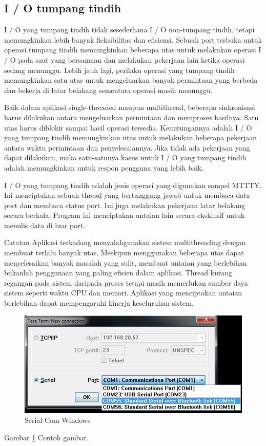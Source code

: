 		\subsection{I / O tumpang tindih}
		\begin{enumerate}
		
				I / O yang tumpang tindih tidak sesederhana I / O non-tumpang tindih, tetapi memungkinkan lebih banyak fleksibilitas dan efisiensi. Sebuah port terbuka untuk operasi tumpang tindih memungkinkan beberapa utas untuk melakukan operasi I / O pada saat yang bersamaan dan melakukan pekerjaan lain ketika operasi sedang menunggu. Lebih jauh lagi, perilaku operasi yang tumpang tindih memungkinkan satu utas untuk mengeluarkan banyak permintaan yang berbeda dan bekerja di latar belakang sementara operasi masih menunggu.

				Baik dalam aplikasi single-threaded maupun multithread, beberapa sinkronisasi harus dilakukan antara mengeluarkan permintaan dan memproses hasilnya. Satu utas harus diblokir sampai hasil operasi tersedia. Keuntungannya adalah I / O yang tumpang tindih memungkinkan utas untuk melakukan beberapa pekerjaan antara waktu permintaan dan penyelesaiannya. Jika tidak ada pekerjaan yang dapat dilakukan, maka satu-satunya kasus untuk I / O yang tumpang tindih adalah memungkinkan untuk respon pengguna yang lebih baik.

				I / O yang tumpang tindih adalah jenis operasi yang digunakan sampel MTTTY. Ini menciptakan sebuah thread yang bertanggung jawab untuk membaca data port dan membaca status port. Ini juga melakukan pekerjaan latar belakang secara berkala. Program ini menciptakan untaian lain secara eksklusif untuk menulis data di luar port.
				
				Catatan Aplikasi terkadang menyalahgunakan sistem multithreading dengan membuat terlalu banyak utas. Meskipun menggunakan beberapa utas dapat menyelesaikan banyak masalah yang sulit, membuat untaian yang berlebihan bukanlah penggunaan yang paling efisien dalam aplikasi. Thread kurang regangan pada sistem daripada proses tetapi masih memerlukan sumber daya sistem seperti waktu CPU dan memori. Aplikasi yang menciptakan untaian berlebihan dapat mempengaruhi kinerja keseluruhan sistem.

		\end{enumerate}

	\begin{figure}[ht]
		\centerline{\includegraphics[width=1\textwidth]{figures/seria.png}}
		\caption{Serial Com Windows}
		\label{seria}
	\end{figure}
	Gambar \ref{seria} Contoh gambar.
		
